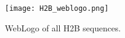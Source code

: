 \begin{figure}
  \centering
  \texttt{[image: H2B\_weblogo.png]}
  \caption{WebLogo of all H2B sequences.}
  \label{fig:h2b-weblogo}
\end{figure}

